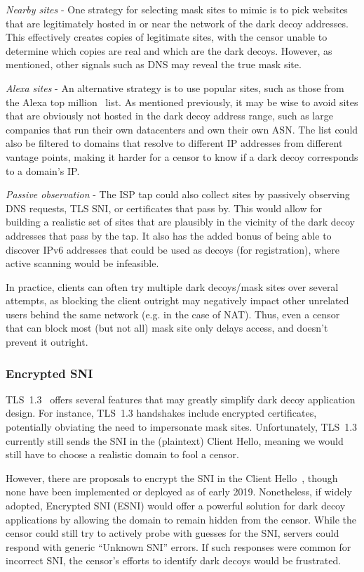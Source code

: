 \documentclass[letterpaper,twocolumn,10pt]{article}
\begin{document}
\smallskip
\noindent
\emph{Nearby sites} - One strategy for selecting mask sites to mimic is to pick websites that are
legitimately hosted in or near the network of the dark decoy addresses. This
effectively creates copies of legitimate sites, with the censor unable to
determine which copies are real and which are the dark decoys. However, as
mentioned, other signals such as DNS may reveal the true mask site.

\smallskip
\noindent
\emph{Alexa sites} -
An alternative strategy is to use popular sites, such as those from the Alexa
top million~\cite{alexa} list. As mentioned previously, it may be wise to avoid
sites that are obviously not hosted in the dark decoy address range, such as
large companies that run their own datacenters and own their own ASN.
The list could also be filtered to domains that resolve to different IP
addresses from different vantage points, making it harder for a censor to know
if a dark decoy corresponds to a domain's IP.

\smallskip
\noindent
\emph{Passive observation} -
The ISP tap could also collect sites by passively observing DNS requests, TLS
SNI, or certificates that pass by. This would allow for building a realistic set
of sites that are plausibly in the vicinity of the dark decoy addresses
that pass by the tap. It also has the added bonus of being able to discover
IPv6 addresses that could be used as decoys (for registration), where active
scanning would be infeasible.

In practice, clients can often try multiple dark decoys/mask sites over
several attempts, as blocking the client outright may negatively impact other
unrelated users behind the same network (e.g. in the case of NAT). Thus, even a
censor that can block most (but not all) mask site only delays access, and
doesn't prevent it outright.

\subsubsection{Encrypted SNI}

TLS~1.3~\cite{tls13} offers several features that may greatly simplify dark
decoy application design. For instance, TLS~1.3 handshakes include encrypted
certificates, potentially obviating the need to impersonate mask sites.
Unfortunately, TLS~1.3 currently still sends the SNI in the (plaintext) Client
Hello, meaning we would still have to choose a realistic domain to fool a
censor.

However, there are proposals to encrypt the SNI in the Client Hello~\cite{esni},
though none have been implemented or deployed as of early 2019. Nonetheless,
if widely adopted, Encrypted SNI (ESNI) would offer a powerful solution for dark
decoy applications by allowing the domain to remain hidden from the censor.
While the censor could still try to actively probe with guesses for the SNI,
servers could respond with generic ``Unknown SNI'' errors. If such responses
were common for incorrect SNI, the censor's efforts to identify dark decoys
would be frustrated.
\end{document}
